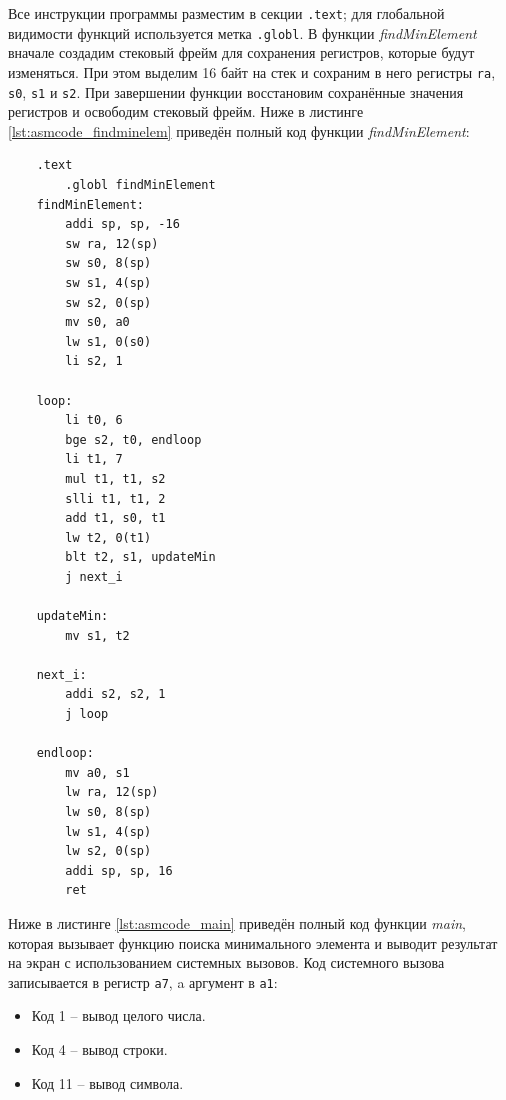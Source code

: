 \documentclass[14pt]{extarticle}
\begin{document}
Все инструкции программы разместим в секции \texttt{.text}; для глобальной видимости функций используется метка \texttt{.globl}.
В функции \textit{findMinElement} вначале создадим стековый фрейм для сохранения регистров, которые будут изменяться. 
При этом выделим 16 байт на стек и сохраним в него регистры \texttt{ra}, \texttt{s0}, \texttt{s1} и \texttt{s2}.
При завершении функции восстановим сохранённые значения регистров и освободим стековый фрейм.
Ниже в листинге \ref{lst:asmcode_findminelem} приведён полный код функции \textit{findMinElement}:
\begin{listing}[H] 
    \begin{verbatim}
	.text
        .globl findMinElement
    findMinElement:
        addi sp, sp, -16
        sw ra, 12(sp)
        sw s0, 8(sp)
        sw s1, 4(sp)
        sw s2, 0(sp)
        mv s0, a0
        lw s1, 0(s0)
        li s2, 1

    loop:
        li t0, 6
        bge s2, t0, endloop
        li t1, 7
        mul t1, t1, s2
        slli t1, t1, 2
        add t1, s0, t1
        lw t2, 0(t1)
        blt t2, s1, updateMin
        j next_i

    updateMin:
        mv s1, t2

    next_i:
        addi s2, s2, 1
        j loop

    endloop:
        mv a0, s1
        lw ra, 12(sp)
        lw s0, 8(sp)
        lw s1, 4(sp)
        lw s2, 0(sp)
        addi sp, sp, 16
        ret
    \end{verbatim} 
\caption{Код функции \textit{findMinElement} на языке ассемблера RISC-V} 
\label{lst:asmcode_findminelem} 
\end{listing}

Ниже в листинге \ref{lst:asmcode_main} приведён полный код функции \textit{main}, которая вызывает функцию поиска минимального элемента и выводит результат на экран с использованием системных вызовов.
Код системного вызова записывается в регистр \texttt{a7}, a аргумент в \texttt{a1}:
\begin{itemize}
    \item Код 1 -- вывод целого числа.
    \item Код 4 -- вывод строки.
    \item Код 11 -- вывод символа.
\end{itemize}
\end{document}
